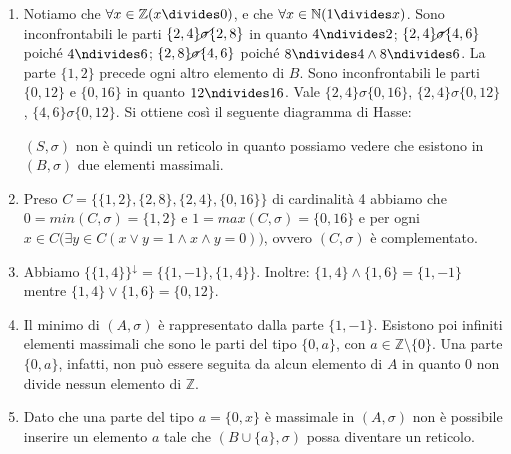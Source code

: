 \begin{enumerate}[label=(\textit{\roman*})]
	\item Notiamo che $\forall x \in \mathbb{Z}(x \divides 0)$, e che $\forall x \in \mathbb{N}(1 \divides x)$. Sono inconfrontabili le parti $\{2,4\} \cancel{\sigma} \{2,8\}$ in quanto $4 \ndivides 2$; $\{2,4\} \cancel{\sigma} \{4,6\}$ poiché $4 \ndivides 6$; $\{2,8\} \cancel{\sigma} \{4,6\}$ poiché $8 \ndivides 4 \land 8 \ndivides 6$. La parte $\{1,2\}$ precede ogni altro elemento di $B$. Sono inconfrontabili le parti $\{0,12\}$ e $\{0,16\}$ in quanto $12 \ndivides 16$. Vale $\{2,4\} \sigma \{0,16\}$, $\{2,4\} \sigma \{0,12\}$, $\{4,6\} \sigma \{0,12\}$. Si ottiene così il seguente diagramma di Hasse:
	\begin{center}
	\end{center}
	$(S,\sigma)$ non è quindi un reticolo in quanto possiamo vedere che esistono in $(B,\sigma)$ due elementi massimali.
	\item Preso $C=\{\{1,2\},\{2,8\},\{2,4\},\{0,16\}\}$ di cardinalità 4 abbiamo che $0 = min(C,\sigma) = \{1,2\}$ e $1 = max(C,\sigma) = \{0,16\}$ e per ogni $x \in C \bigl(\exists y \in C (x \vee y = 1 \land x \wedge y = 0)\bigr)$, ovvero $(C,\sigma)$ è complementato.
	\item Abbiamo $\{\{1,4\}\}^{\downarrow} = \{\{1,-1\},\{1,4\}\}$. Inoltre: $\{1,4\} \wedge \{1,6\}=\{1,-1\}$ mentre $\{1,4\} \vee \{1,6\} = \{0,12\}$.
	\item Il minimo di $(A,\sigma)$ è rappresentato dalla parte $\{1,-1\}$. Esistono poi infiniti elementi massimali che sono le parti del tipo $\{0,a\}$, con $a \in \mathbb{Z}\setminus\{0\}$. Una parte $\{0,a\}$, infatti, non può essere seguita da alcun elemento di $A$ in quanto 0 non divide nessun elemento di $\mathbb{Z}$.
	\item Dato che una parte del tipo $a=\{0,x\}$ è massimale in $(A,\sigma)$ non è possibile inserire un elemento $a$ tale che $(B \cup \{a\},\sigma)$ possa diventare un reticolo.
\end{enumerate}
